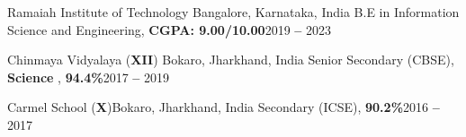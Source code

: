 % 
\vspace{2pt}
  \resumeSubHeadingListStart
    

    \resumeSubheading
    {Ramaiah Institute of Technology
      }{Bangalore, Karnataka, India}
      {B.E in Information Science and Engineering, \textbf{CGPA: 9.00/10.00}}{2019 \textbf{--} 2023}
      
    \resumeSubheading
      {Chinmaya Vidyalaya (\textbf{XII})
      }{Bokaro, Jharkhand, India}
      {Senior Secondary (CBSE), \textbf{Science} , \textbf{94.4\%}}{2017 \textbf{--} 2019}

    \resumeSubheading
    {Carmel School (\textbf{X})}{Bokaro, Jharkhand, India}
      {Secondary (ICSE), \textbf{90.2\%}}{2016 \textbf{--} 2017}
  \resumeSubHeadingListEnd
